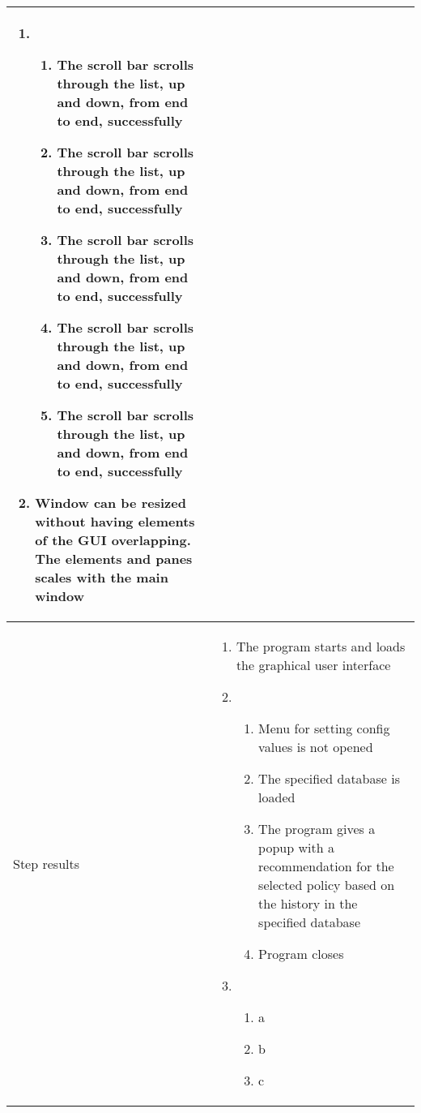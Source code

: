 \begin{center}
\begin{longtable}{ | p{4cm} | p{10cm} | }
\begin{enumerate}
							\item 
							\begin{enumerate}
								\item The scroll bar scrolls through the list, up and down, from end to end, successfully
								\item The scroll bar scrolls through the list, up and down, from end to end, successfully
								\item The scroll bar scrolls through the list, up and down, from end to end, successfully
								\item The scroll bar scrolls through the list, up and down, from end to end, successfully									\item The scroll bar scrolls through the list, up and down, from end to end, successfully
							\end{enumerate}

							\item Window can be resized without having elements of the GUI overlapping. The elements and panes scales with the main window
						\end{enumerate}
							 \\  [3pt] \hline

			Step results & 	\begin{enumerate}
							\item The program starts and loads the graphical user interface

							\item  
							\begin{enumerate}
								\item Menu for setting config values is not opened
								\item The specified database is loaded
								\item The program gives a popup with a recommendation for the selected policy based on the history in the specified database
								\item Program closes
							\end{enumerate}
							
							\item
							\begin{enumerate}
								\item a
								\item b
								\item c
							\end{enumerate}


\end{enumerate}
\end{longtable}
\end{center}
